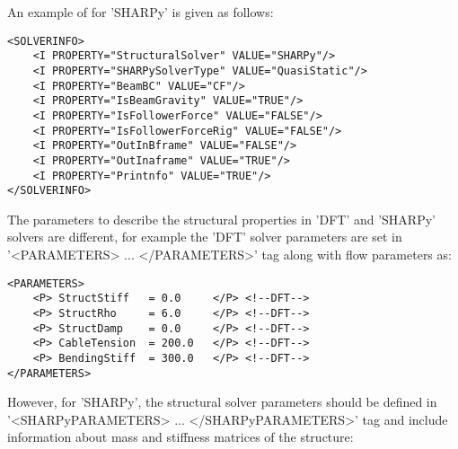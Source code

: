 An example of  for 'SHARPy' is given as follows:
\begin{lstlisting}[style=XMLStyle]
<SOLVERINFO>
    <I PROPERTY="StructuralSolver" VALUE="SHARPy"/>
    <I PROPERTY="SHARPySolverType" VALUE="QuasiStatic"/>
    <I PROPERTY="BeamBC" VALUE="CF"/>
    <I PROPERTY="IsBeamGravity" VALUE="TRUE"/>
    <I PROPERTY="IsFollowerForce" VALUE="FALSE"/>
    <I PROPERTY="IsFollowerForceRig" VALUE="FALSE"/>
    <I PROPERTY="OutInBframe" VALUE="FALSE"/>
    <I PROPERTY="OutInaframe" VALUE="TRUE"/>
    <I PROPERTY="Printnfo" VALUE="TRUE"/>
</SOLVERINFO>
\end{lstlisting}

The parameters to describe the structural properties in 'DFT' and 'SHARPy' solvers are different, for example the 'DFT' solver parameters are set in '<PARAMETERS> ... </PARAMETERS>' tag along with flow parameters as:

\begin{lstlisting}[style=XMLStyle]
<PARAMETERS>
    <P> StructStiff   = 0.0     </P> <!--DFT-->
    <P> StructRho     = 6.0     </P> <!--DFT-->
    <P> StructDamp    = 0.0     </P> <!--DFT-->
    <P> CableTension  = 200.0   </P> <!--DFT-->
    <P> BendingStiff  = 300.0   </P> <!--DFT-->
</PARAMETERS>
\end{lstlisting}

However, for 'SHARPy', the structural solver parameters should be defined in '<SHARPyPARAMETERS> ... </SHARPyPARAMETERS>' tag and include information about mass and stiffness matrices of the structure:

